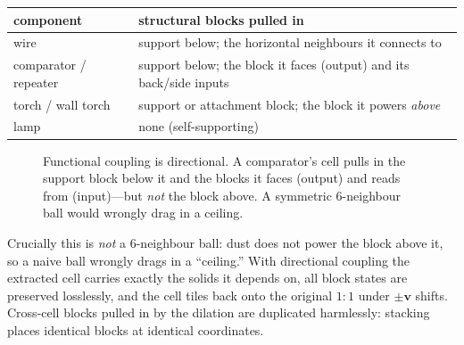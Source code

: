 \documentclass[11pt]{article}
\newcommand{\vv}{\mathbf{v}}
\begin{document}
\begin{center}
\begin{tabular}{@{}ll@{}}
\toprule
component & structural blocks pulled in \\
\midrule
wire & support below; the horizontal neighbours it connects to \\
comparator / repeater & support below; the block it faces (output) and its back/side inputs \\
torch / wall torch & support or attachment block; the block it powers \emph{above} \\
lamp & none (self-supporting) \\
\bottomrule
\end{tabular}
\end{center}

\begin{figure}[ht]
\centering
{}
\caption{Functional coupling is directional. A comparator's cell pulls in the
support block below it and the blocks it faces (output) and reads from
(input)---but \emph{not} the block above. A symmetric 6-neighbour ball would
wrongly drag in a ceiling.}
\label{fig:coupling}
\end{figure}

Crucially this is \emph{not} a 6-neighbour ball: dust does not power the block
above it, so a naive ball wrongly drags in a ``ceiling.'' With directional
coupling the extracted cell carries exactly the solids it depends on, all block
states are preserved losslessly, and the cell tiles back onto the original
$1{:}1$ under $\pm\vv$ shifts. Cross-cell blocks pulled in by the dilation are
duplicated harmlessly: stacking places identical blocks at identical coordinates.
\end{document}
